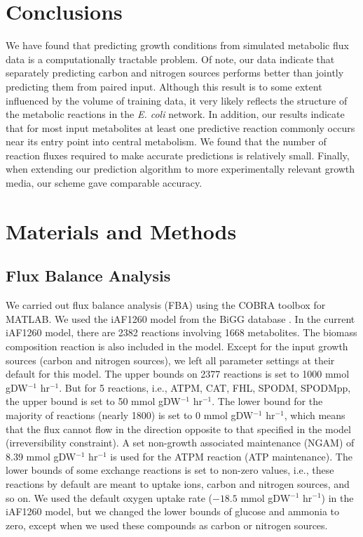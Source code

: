 \documentclass[12pt]{article}
\begin{document}
\section{Conclusions}

We have found that predicting growth conditions from simulated metabolic flux data is a computationally tractable problem. Of note, our data indicate that separately predicting carbon and nitrogen sources performs better than jointly predicting them from paired input. Although this result is to some extent influenced by the volume of training data, it very likely reflects the structure of the metabolic reactions in the \emph{E. coli} network. In addition, our results indicate that for most input metabolites at least one predictive reaction commonly occurs near its entry point into central metabolism. We found that the number of reaction fluxes required to make accurate predictions is relatively small. Finally, when extending our prediction algorithm to more experimentally relevant growth media, our scheme gave comparable accuracy.




\section{Materials and Methods}

\subsection{Flux Balance Analysis} 

We carried out flux balance analysis (FBA) using the COBRA toolbox \cite{Schellenbergeretal2011} for MATLAB. 
We used the iAF1260 model from the BiGG database \cite{Schellenbergeretal2010}. In the current iAF1260 model, there are 2382 reactions involving 1668 metabolites. The biomass composition reaction is also included in the model. Except for the input growth sources (carbon and nitrogen sources), we left all parameter settings at their default for this model. The upper bounds on 2377 reactions is set to 1000  mmol gDW$^{-1}$ hr$^{-1}$. But for 5 reactions, i.e., ATPM, CAT, FHL, SPODM, SPODMpp, the upper bound is set to 50 mmol gDW$^{-1}$ hr$^{-1}$. The lower bound for the majority of reactions (nearly 1800) is set to 0 mmol gDW$^{-1}$ hr$^{-1}$, which means that the flux cannot flow in the direction opposite to that specified in the model (irreversibility constraint). A set non-growth associated maintenance (NGAM) of 8.39  mmol gDW$^{-1}$ hr$^{-1}$ is used for the ATPM reaction (ATP maintenance). The lower bounds of some exchange reactions is set to non-zero values, i.e., these reactions by default are meant to uptake ions, carbon and nitrogen sources, and so on. We used the default oxygen uptake rate ($-18.5$ mmol gDW$^{-1}$ hr$^{-1}$) in the iAF1260 model, but we changed the lower bounds of glucose and ammonia to zero, except when we used these compounds as carbon or nitrogen sources.
\end{document}
